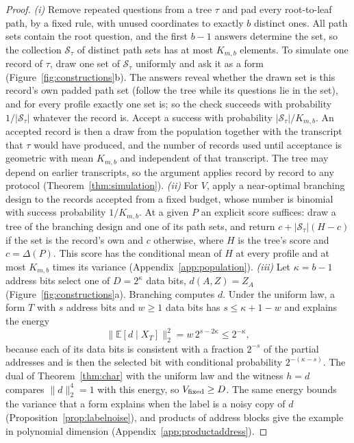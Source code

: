 \documentclass{article}
\newcommand{\E}{\mathbb{E}}
\begin{document}
\begin{proof}
\emph{(i)} Remove repeated questions from a tree $\tau$ and pad every root-to-leaf path, by a fixed rule, with unused coordinates to exactly $b$ distinct ones. All path sets contain the root question, and the first $b-1$ answers determine the set, so the collection $\mathcal S_\tau$ of distinct path sets has at most $K_{m,b}$ elements. To simulate one record of $\tau$, draw one set of $\mathcal S_\tau$ uniformly and ask it as a form (Figure~\ref{fig:constructions}b). The answers reveal whether the drawn set is this record's own padded path set (follow the tree while its questions lie in the set), and for every profile exactly one set is; so the check succeeds with probability $1/|\mathcal S_\tau|$ whatever the record is. Accept a success with probability $|\mathcal S_\tau|/K_{m,b}$. An accepted record is then a draw from the population together with the transcript that $\tau$ would have produced, and the number of records used until acceptance is geometric with mean $K_{m,b}$ and independent of that transcript. The tree may depend on earlier transcripts, so the argument applies record by record to any protocol (Theorem~\ref{thm:simulation}). \emph{(ii)} For $V$, apply a near-optimal branching design to the records accepted from a fixed budget, whose number is binomial with success probability $1/K_{m,b}$. At a given $P$ an explicit score suffices: draw a tree of the branching design and one of its path sets, and return $c+|\mathcal S_\tau|(H-c)$ if the set is the record's own and $c$ otherwise, where $H$ is the tree's score and $c=\Delta(P)$. This score has the conditional mean of $H$ at every profile and at most $K_{m,b}$ times its variance (Appendix~\ref{app:population}). \emph{(iii)} Let $\kappa=b-1$ address bits select one of $D=2^\kappa$ data bits, $d(A,Z)=Z_A$ (Figure~\ref{fig:constructions}a). Branching computes $d$. Under the uniform law, a form $T$ with $s$ address bits and $w\ge1$ data bits has $s\le\kappa+1-w$ and explains the energy
\begin{equation}
 \|\E[d\mid X_T]\|_2^2=w\,2^{s-2\kappa}\le2^{-\kappa},\label{eq:addressinformation}
\end{equation}
because each of its data bits is consistent with a fraction $2^{-s}$ of the partial addresses and is then the selected bit with conditional probability $2^{-(\kappa-s)}$. The dual of Theorem~\ref{thm:char} with the uniform law and the witness $h=d$ compares $\|d\|_2^4=1$ with this energy, so $V_{\rm fixed}\ge D$. The same energy bounds the variance that a form explains when the label is a noisy copy of $d$ (Proposition~\ref{prop:labelnoise}), and products of address blocks give the example in polynomial dimension (Appendix~\ref{app:productaddress}).
\end{proof}
\end{document}
